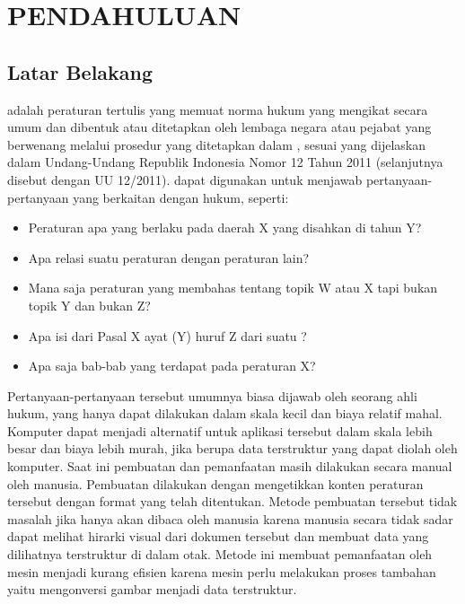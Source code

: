 \chapter{PENDAHULUAN}
\label{chap:1}

\section{Latar Belakang}
\label{sec:latar-belakang}

\Legal adalah peraturan tertulis yang memuat norma hukum yang mengikat secara umum dan dibentuk atau
ditetapkan oleh lembaga negara atau pejabat yang berwenang melalui prosedur yang ditetapkan dalam
\legal, sesuai yang dijelaskan dalam Undang-Undang Republik Indonesia Nomor 12 Tahun 2011
(selanjutnya disebut dengan UU 12/2011). \Legal dapat digunakan untuk menjawab pertanyaan-pertanyaan
yang berkaitan dengan hukum, seperti:

\begin{itemize}
  \item Peraturan apa yang berlaku pada daerah X yang disahkan di tahun Y?
  \item Apa relasi suatu peraturan dengan peraturan lain?
  \item Mana saja peraturan yang membahas tentang topik W atau X tapi bukan topik Y dan bukan Z?
  \item Apa isi dari Pasal X ayat (Y) huruf Z dari suatu \legal?
  \item Apa saja bab-bab yang terdapat pada peraturan X?
\end{itemize}

Pertanyaan-pertanyaan tersebut umumnya biasa dijawab oleh seorang ahli hukum, yang hanya dapat
dilakukan dalam skala kecil dan biaya relatif mahal. Komputer dapat menjadi alternatif untuk
aplikasi tersebut dalam skala lebih besar dan biaya lebih murah, jika \legal berupa data terstruktur
yang dapat diolah oleh komputer. Saat ini pembuatan dan pemanfaatan \legal masih dilakukan secara
manual oleh manusia. Pembuatan \legal dilakukan dengan mengetikkan konten peraturan tersebut dengan
format yang telah ditentukan. Metode pembuatan tersebut tidak masalah jika hanya akan dibaca oleh
manusia karena manusia secara tidak sadar dapat melihat hirarki visual dari dokumen tersebut dan
membuat data yang dilihatnya terstruktur di dalam otak. Metode ini membuat pemanfaatan \legal oleh
mesin menjadi kurang efisien karena mesin perlu melakukan proses tambahan yaitu mengonversi gambar
menjadi data terstruktur.

